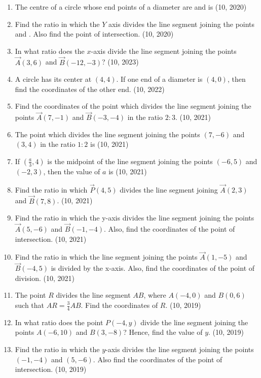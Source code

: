 \begin{enumerate}[label=\thesubsection.\arabic*,ref=\thesubsection.\theenumi]
\item The centre of a circle whose end points of a diameter are  and  is
\hfill (10, 2020)
\item Find the ratio in which the $Y$ axis  divides the line segment joining the points  and . Also find the point of intersection.
\hfill (10, 2020)
    \item In what ratio does the $x$-axis divide the line segment joining the points $\vec{A}(3,6)$ and $\vec{B}(-12, -3)$?
    \hfill (10, 2023)
    \item A circle has its center at $(4,4)$. If one end of a diameter is $(4,0)$, then find the coordinates of the other end.
    \hfill (10, 2022)
	\item Find the coordinates of the point which divides the line segment joining the points $\vec{A}(7, -1)$ and $\vec{B}(-3, -4)$ in the ratio $2:3$. \hfill (10, 2021)
		\item The point which divides the line segment joining the points $(7, -6)$ and $(3, 4)$ in the ratio $1:2$ is
		\hfill (10, 2021)
		\item If $\left(\frac{a}{3}, 4\right)$ is the midpoint of the line segment joining the points $(-6, 5)$ and $(-2, 3)$, then the value of $a$ is
		\hfill (10, 2021)
		\item Find the ratio in which $\vec{P}(4, 5)$ divides the line segment joining $\vec{A}(2, 3)$ and $\vec{B}(7, 8)$. \hfill (10, 2021)
		\item Find the ratio in which the y-axis divides the line segment joining the points $\vec{A}(5, -6)$ and $\vec{B}(-1, -4)$. Also, find the coordinates of the point of intersection. \hfill (10, 2021)
		\item Find the ratio in which the line segment joining the points $\vec{A}(1, -5)$ and $\vec{B}(-4, 5)$ is divided by the x-axis. Also, find the coordinates of the point of division. \hfill (10, 2021)
\item The point $R$ divides the line segment $AB$, where $A(-4, 0)$ and $B(0, 6)$ such that $AR = \frac{3}{4} AB$. Find the coordinates of $R$. \hfill (10, 2019)
\item In what ratio does the point $P(-4, y)$ divide the line segment joining the points $A(-6, 10)$ and $B(3, -8)$? Hence, find the value of $y$. \hfill (10, 2019)
\item Find the ratio in which the $y$-axis divides the line segment joining the points $(-1, -4)$ and $(5, -6)$. Also find the coordinates of the point of intersection. \hfill (10, 2019)

\end{enumerate}
